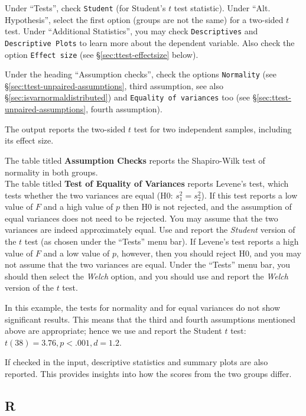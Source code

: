 \documentclass[
]{book}
\begin{document}
Under ``Tests'', check \texttt{Student} (for Student's \(t\) test statistic). Under ``Alt. Hypothesis'', select the first option (groups are not the same) for a two-sided \(t\) test.
Under ``Additional Statistics'', you may check \texttt{Descriptives} and \texttt{Descriptive\ Plots} to learn more about the dependent variable. Also check the option \texttt{Effect\ size} (see §\ref{sec:ttest-effectsize} below).

Under the heading ``Assumption checks'', check the options \texttt{Normality} (see
§\ref{sec:ttest-unpaired-assumptions}, third assumption, see also\\
§\ref{sec:isvarnormaldistributed}) and \texttt{Equality\ of\ variances} too (see §\ref{sec:ttest-unpaired-assumptions}, fourth assumption).

The output reports the two-sided \(t\) test for two independent samples, including its effect size.

The table titled \textbf{Assumption Checks} reports the Shapiro-Wilk test of normality in both groups.\\
The table titled \textbf{Test of Equality of Variances} reports Levene's test, which tests whether the two variances are equal (H0: \(s^2_1 = s^2_2\)).
If this test reports a low value of \(F\) and a high value of \(p\) then H0 is not rejected, and the assumption of equal variances does not need to be rejected. You may assume that the two variances are indeed approximately equal. Use and report the \emph{Student} version of the \(t\) test (as chosen under the ``Tests'' menu bar).
If Levene's test reports a high value of \(F\) and a low value of \(p\), however, then you should reject H0, and you may not assume that the two variances are equal. Under the ``Tests'' menu bar, you should then select the \emph{Welch} option, and you should use and report the \emph{Welch} version of the \(t\) test.

In this example, the tests for normality and for equal variances do not show significant results. This means that the third and fourth assumptions mentioned above are appropriate; hence we use and report the Student \(t\) test: \(t(38)=3.76, p<.001, d=1.2\).

If checked in the input, descriptive statistics and summary plots are also reported. This provides insights into how the scores from the two groups differ.

\subsection{R}\label{sec:R-ttest-unpaired}
\end{document}
